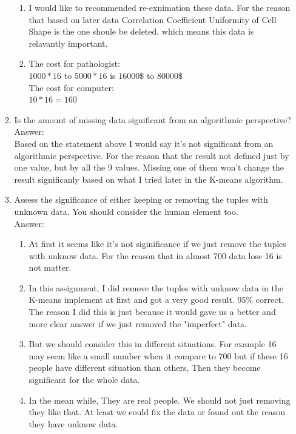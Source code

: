 \documentclass{article}
\begin{document}
\begin{enumerate}
\begin{enumerate}
 	  \begin{enumerate}
 	  	\item  I would like to recommended re-exnimation these data. For the reason that based on later data Correlation Coefficient  Uniformity of Cell Shape is the one shoule be deleted, which means this data is relavantly important.\\
 	  	\item 
 	  	The cost for pathologist:\\
 	  	$1000 * 16$ to $5000 * 16$ is $16000\$$ to $80000\$$\\
 	  	The cost for computer:\\
 	  	$10 * 16 = 160$\\ 
 	  \end{enumerate}
 	  
  \item Is the amount of missing data significant from an algorithmic perspective? \\
  Answer:\\
  Based on the statement above I would say it's not significant from an algorithmic perspective. For the reason that the result not defined just by one value, but by all the 9 values. Missing one of them won't change the result significanly based on what I tried later in the K-means algorithm.
  \item Assess the significance of either keeping or removing the tuples with unknown data. You should consider the human element too.\\
  Answer:\\
  \begin{enumerate}
  	\item At first it seems like it's not siginificance if we just remove the tuples with unknow data. For the reason that in almost 700 data lose 16 is not matter. 
  	\item In this assignment, I did remove the tuples with unknow data in the K-means implement at first and got a very good result. 95\% correct. The reason I did this is just because it would gave us a better and more clear answer if we just removed the "imperfect" data.
  	\item But we should consider this in different situations. For example 16 may seem like a small number when it compare to 700 but if these 16 people have different situation than others, Then they become significant for the whole data.
  	\item In the mean while, They are real people. We should not just removing they like that. At least we could fix the data or found out the reason they have unknow data.

\end{enumerate}
\end{enumerate}
\end{enumerate}
\end{document}
